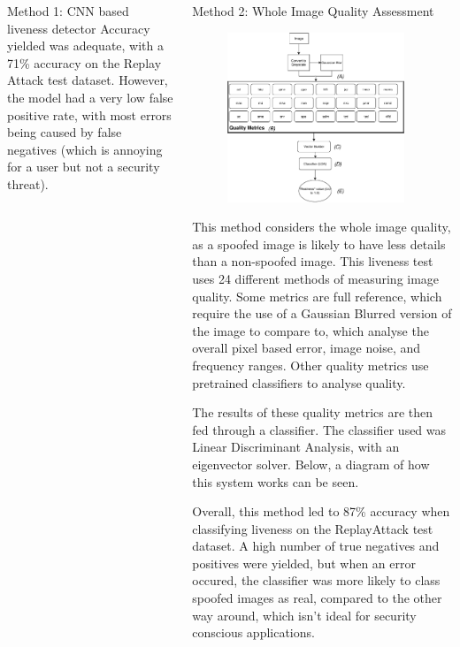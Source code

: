 \documentclass[final]{beamer}
\begin{document}
\begin{frame}{}
\begin{columns}[t]
\begin{column}{.48\linewidth}
\begin{block}{Method 1: CNN based liveness detector}
          Accuracy yielded was adequate, with a 71\% accuracy on the Replay Attack test dataset. 
          However, the model had a very low false positive rate,
          with most errors being caused by false negatives (which is annoying for a user but not a security threat).

        \end{block}
      \end{column}

      \begin{column}{.48\linewidth}
        \begin{block}{Method 2: Whole Image Quality Assessment}
          \begin{figure}
            \includegraphics[width=200px]{ImageQualityLivenessTest.pdf}
          \end{figure}
          This method considers the whole image quality, as a spoofed image is likely to have less details than a non-spoofed image.
          This liveness test uses 24 different methods of measuring image quality. Some metrics are full reference, which require the use of a Gaussian Blurred
          version of the image to compare to, which analyse the overall pixel based error, image noise, and frequency ranges. Other quality metrics use pretrained classifiers
          to analyse quality.
        
          The results of these quality metrics are then fed through a classifier. The classifier used was Linear Discriminant Analysis, with an eigenvector solver.
          Below, a diagram of how this system works can be seen.

          Overall, this method led to 87\% accuracy when classifying liveness on the ReplayAttack test dataset. 
          A high number of true negatives and positives were yielded, but when an error occured, the classifier was more likely to class
          spoofed images as real, compared to the other way around, which isn't ideal for security conscious applications.


\end{block}
\end{column}
\end{columns}
\end{frame}
\end{document}

